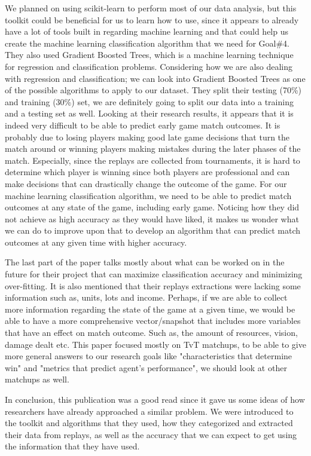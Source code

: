 \documentclass[a4paper,12pt]{report}
\begin{document}
We planned on using scikit-learn to perform most of our data analysis, but this toolkit could be beneficial for us to learn how to use, since it appears to already have a lot of tools built in regarding machine learning and that could help us create the machine learning classification algorithm that we need for Goal\#4. They also used Gradient Boosted Trees, which is a machine learning technique for regression and classification problems. Considering how we are also dealing with regression and classification; we can look into Gradient Boosted Trees as one of the possible algorithms to apply to our dataset. They split their testing (70\%) and training (30\%) set, we are definitely going to split our data into a training and a testing set as well. Looking at their research results, it appears that it is indeed very difficult to be able to predict early game match outcomes. It is probably due to losing players making good late game decisions that turn the match around or winning players making mistakes during the later phases of the match. Especially, since the replays are collected from tournaments, it is hard to determine which player is winning since both players are professional and can make decisions that can drastically change the outcome of the game. For our machine learning classification algorithm, we need to be able to predict match outcomes at any state of the game, including early game. Noticing how they did not achieve as high accuracy as they would have liked, it makes us wonder what we can do to improve upon that to develop an algorithm that can predict match outcomes at any given time with higher accuracy.

The last part of the paper talks mostly about what can be worked on in the future for their project that can maximize classification accuracy and minimizing over-fitting. It is also mentioned that their replays extractions were lacking some information such as, units, lots and income.
Perhaps, if we are able to collect more information regarding the state of the game at a given time, we would be able to have a more comprehensive vector/snapshot that includes more variables that have an effect on match outcome. Such as, the amount of resources, vision, damage dealt etc. This paper focused mostly on TvT matchups, to be able to give more general answers to our research goals like "characteristics that determine win" and "metrics that predict agent’s performance", we should look at other matchups as well.

In conclusion, this publication was a good read since it gave us some ideas of how researchers have already approached a similar problem. We were introduced to the toolkit and algorithms that they used, how they categorized and extracted their data from replays, as well as the accuracy that we can expect to get using the information that they have used.
\end{document}
